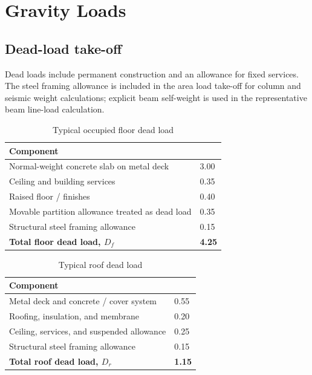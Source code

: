 \section{Gravity Loads}

\subsection{Dead-load take-off}
Dead loads include permanent construction and an allowance for fixed services. The
steel framing allowance is included in the area load take-off for column and seismic
weight calculations; explicit beam self-weight is used in the representative beam
line-load calculation.

\begin{table}[htbp]
\centering
\caption{Typical occupied floor dead load}
\begin{tabularx}{\textwidth}{@{}Y R{31mm}@{}}
  \toprule
  \textbf{Component} &  \\
  \midrule
  Normal-weight concrete slab on metal deck & 3.00 \\
  Ceiling and building services & 0.35 \\
  Raised floor / finishes & 0.40 \\
  Movable partition allowance treated as dead load & 0.35 \\
  Structural steel framing allowance & 0.15 \\
  \midrule
  \textbf{Total floor dead load, $D_f$} & \textbf{4.25} \\
  \bottomrule
\end{tabularx}
\end{table}

\begin{table}[htbp]
\centering
\caption{Typical roof dead load}
\begin{tabularx}{\textwidth}{@{}Y R{31mm}@{}}
  \toprule
  \textbf{Component} &  \\
  \midrule
  Metal deck and concrete / cover system & 0.55 \\
  Roofing, insulation, and membrane & 0.20 \\
  Ceiling, services, and suspended allowance & 0.25 \\
  Structural steel framing allowance & 0.15 \\
  \midrule
  \textbf{Total roof dead load, $D_r$} & \textbf{1.15} \\
  \bottomrule
\end{tabularx}
\end{table}

